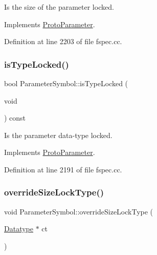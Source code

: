 Is the size of the parameter locked. 



Implements \mbox{\hyperlink{class_proto_parameter_ad1a249d140c17d040845d0bcf8307fd0}{Proto\+Parameter}}.



Definition at line 2203 of file fspec.\+cc.

\mbox{\label{class_parameter_symbol_a91e7013d6ae6692ca8bdd95834625a2d}} 
\subsubsection{\texorpdfstring{isTypeLocked()}{isTypeLocked()}}
{\footnotesize\ttfamily bool Parameter\+Symbol\+::is\+Type\+Locked (\begin{DoxyParamCaption}\item[{void}]{ }\end{DoxyParamCaption}) const\hspace{0.3cm}{\ttfamily [virtual]}}



Is the parameter data-\/type locked. 



Implements \mbox{\hyperlink{class_proto_parameter_a155b564b34ae0b36d39d5a1caf5d0014}{Proto\+Parameter}}.



Definition at line 2191 of file fspec.\+cc.

\mbox{\label{class_parameter_symbol_a248a7be27fb94eeebe4628d623616a6d}} 
\subsubsection{\texorpdfstring{overrideSizeLockType()}{overrideSizeLockType()}}
{\footnotesize\ttfamily void Parameter\+Symbol\+::override\+Size\+Lock\+Type (\begin{DoxyParamCaption}\item[{\mbox{\hyperlink{class_datatype}{Datatype}} $\ast$}]{ct }\end{DoxyParamCaption})\hspace{0.3cm}{\ttfamily [virtual]}}



